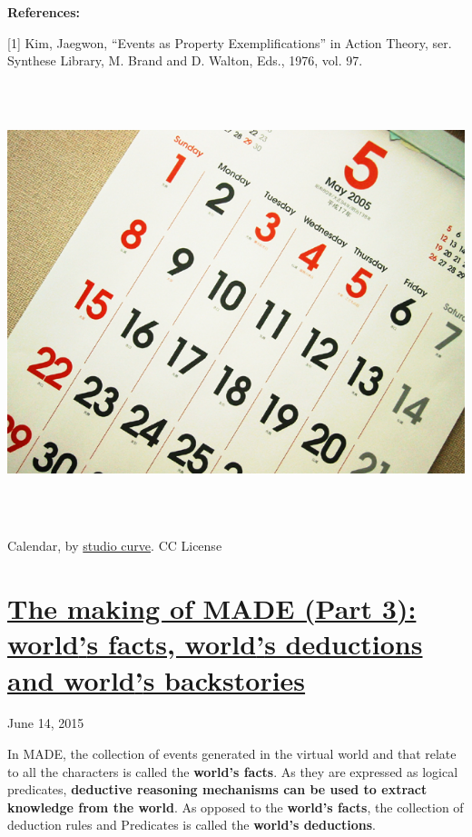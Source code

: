 \documentclass[a4paper]{article}
\newcommand\textstyleStrongEmphasis[1]{\textbf{#1}}
\begin{document}
{\bfseries
References:}

[1] Kim, Jaegwon, {\textquotedblleft}Events as Property
Exemplifications{\textquotedblright} in Action Theory, ser. Synthese
Library, M. Brand and D. Walton, Eds., 1976, vol. 97.

\href{http://www.velonuboso.com/made/blog/wp-content/uploads/2015/06/13080208_dee098a3d4_o.jpg}{
\includegraphics[width=16.986cm,height=12.753cm]{makingofmade113-img2.jpg}
}

Calendar, by \href{https://www.flickr.com/photos/studiocurve/}{studio
curve}. CC License

\bigskip

\clearpage\section[The making of MADE (Part 3): world{\textquoteright}s
facts, world{\textquoteright}s deductions and world{\textquoteright}s
backstories]{\href{http://www.velonuboso.com/made/2015/06/14/making-part-3-worlds-facts-worlds-deductions-worlds-backstories/}{The
making of MADE (Part 3): world{\textquoteright}s facts,
world{\textquoteright}s deductions and world{\textquoteright}s
backstories}}
June 14, 2015

In MADE, the collection of events generated in the virtual world and
that relate to all the characters is called the
\textstyleStrongEmphasis{world{\textquoteright}s facts}. As they are
expressed as logical predicates, \textstyleStrongEmphasis{deductive
reasoning mechanisms can be used to extract knowledge from the world}.
As opposed to the \textstyleStrongEmphasis{world{\textquoteright}s
facts}, the collection of deduction rules and Predicates is called the
\textstyleStrongEmphasis{world{\textquoteright}s deductions}.
\end{document}
